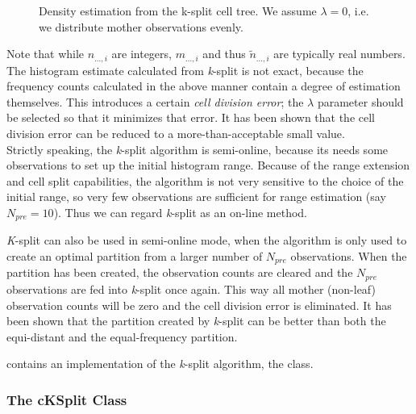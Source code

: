 \begin{figure}[htbp]
  \begin{center}
    
    \caption{Density estimation from the k-split cell tree. We
      assume $\lambda=0$, i.e. we distribute mother observations
      evenly.}
  \end{center}
\end{figure}


Note that while $n_{...,i}$ are integers, $m_{...,i}$ and thus
$\tilde{n}_{...,i}$ are typically real numbers. The histogram estimate
calculated from \textit{k}-split is not exact, because the frequency
counts calculated in the above manner contain a degree of estimation
themselves. This introduces a certain \textit{cell division error};
the $\lambda$ parameter should be selected so that it minimizes that
error. It has been shown that the cell division error can
be reduced to a more-than-acceptable small value.\\
Strictly speaking, the \textit{k}-split algorithm is semi-online,
because its needs some observations to set up the initial histogram
range.  Because of the range extension and cell split
capabilities, the algorithm is not very sensitive to the choice of the
initial range, so very few observations are sufficient for range
estimation (say $N_{pre}=10$). Thus we can regard \textit{k}-split as
an on-line method.

\textit{K}-split can also be used in semi-online mode, when the
algorithm is only used to create an optimal partition from a larger
number of $N_{pre}$ observations. When the partition has been created,
the observation counts are cleared and the $N_{pre}$ observations are
fed into \textit{k}-split once again. This way all mother (non-leaf)
observation counts will be zero and the cell division error is
eliminated. It has been shown that the partition created by
\textit{k}-split can be better than both the equi-distant and the
equal-frequency partition.

{\opp} contains an implementation of the \textit{k}-split algorithm,
the  class.


\subsubsection{The cKSplit Class}
\label{sec:sim-lib:cksplit-class}

